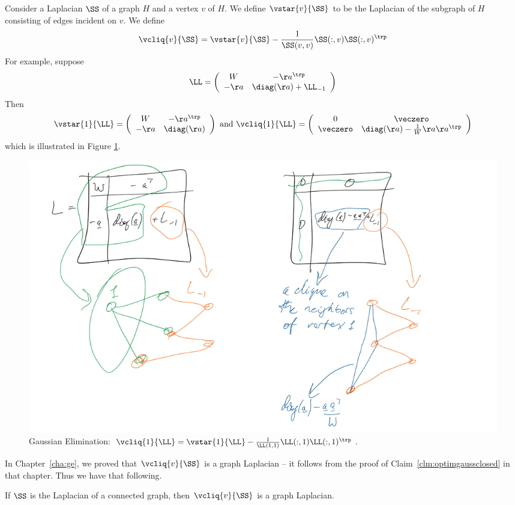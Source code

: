 Consider a Laplacian $\SS$ of a graph $H$ and a vertex $v$ of $H$.
We define $\vstar{v}{\SS}$ to be the Laplacian of the subgraph of $H$
consisting of edges incident on $v$.
We define
\[
\vcliq{v}{\SS} = \vstar{v}{\SS} - \frac{1}{\SS(v,v)} \SS(:,v)  \SS(:,v)^{\trp}
\]
For example, suppose
\[
  \LL =
\left(
\begin{array}{ccc}
W & -\aa^\trp \\
-\aa& \diag(\aa) + \LL_{-1}
\end{array} \right)
\]
Then
\[
\vstar{1}{\LL}
=
\left(
\begin{array}{ccc}
W & -\aa^\trp \\
-\aa& \diag(\aa)
\end{array} \right)
\text{ and }
\vcliq{1}{\LL}
=
\left(
\begin{array}{ccc}
0 &  \veczero \\
\veczero & \diag(\aa) - \frac{1}{W} \aa \aa^\trp
\end{array} \right)
\]
which is illustrated in Figure \ref{fig:schurcliqueagain}.
%
\begin{figure}[H]
  \centering
  \includegraphics[width=1
  \textwidth]{fig/lecture7_schur-clique.jpeg}
  \caption{Gaussian Elimination:
    $\vcliq{1}{\LL} = \vstar{1}{\LL} - \frac{1}{\LL(1,1)} \LL(:,1)
    \LL(:,1)^{\trp}$.}
      \label{fig:schurcliqueagain}
    \end{figure}
In Chapter~\ref{cha:ge}, we proved that $\vcliq{v}{\SS}$ is a graph Laplacian --
it follows from the proof of Claim~\ref{clm:optimgaussclosed} in that chapter.
Thus we have that following.
 \begin{claim}
\label{clm:optimgaussclosedagain}
If $\SS$ is the Laplacian of a connected graph, then
$\vcliq{v}{\SS}$ is a graph Laplacian.
\end{claim}

